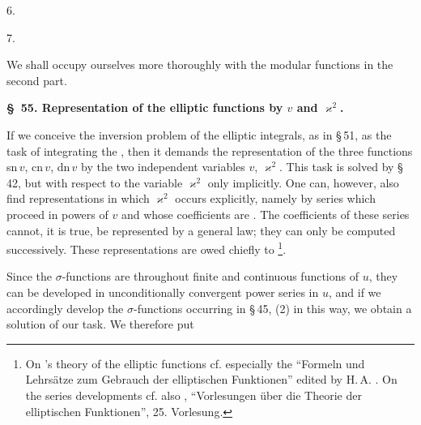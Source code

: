 6.  %

7. 

We shall occupy ourselves more thoroughly with the modular functions in the second part.

\begin{center}
\textbf{\S\ 55. Representation of the elliptic functions by $v$ and $\varkappa^2$.}
\end{center}

If we conceive the inversion problem of the elliptic integrals, as in \S\,51, as the task of integrating the , then it demands the representation of the three functions sn\,$v$, cn\,$v$, dn\,$v$ by the two independent variables $v$, $\varkappa^2$. This task is solved by \S\,42, but with respect to the variable $\varkappa^2$ only implicitly. One can, however, also find representations in which $\varkappa^2$ occurs explicitly, namely by series which proceed in powers of $v$ and whose coefficients are . The coefficients of these series cannot, it is true, be represented by a general law; they can only be computed successively. These representations are owed chiefly to \footnote{On 's theory of the elliptic functions cf. especially the ``Formeln und Lehrsätze zum Gebrauch der elliptischen Funktionen'' edited by H.\,A. . On the series developments cf. also , ``Vorlesungen über die Theorie der elliptischen Funktionen'', 25. Vorlesung.}.

Since the $\sigma$-functions are throughout finite and continuous functions of $u$, they can be developed in unconditionally convergent power series in $u$, and if we accordingly develop the $\sigma$-functions occurring in \S\,45, (2) in this way, we obtain a solution of our task. We therefore put
